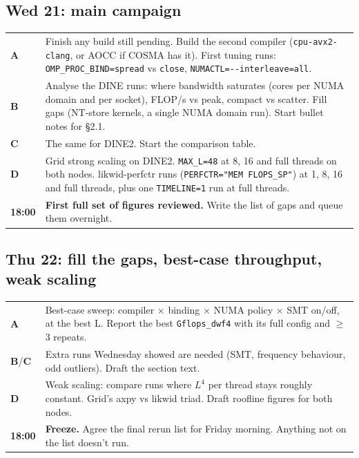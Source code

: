 \documentclass[10pt,a4paper]{article}
\newcommand{\who}[1]{\textbf{\color{accent}#1}}
\begin{document}
\subsection*{Wed 21: main campaign}
\begin{tabularx}{\linewidth}{@{}l L@{}}
\toprule
\who{A} & Finish any build still pending. Build the second compiler (\texttt{cpu-avx2-clang}, or AOCC if COSMA has it). First tuning runs: \texttt{OMP\_PROC\_BIND=spread} vs \texttt{close}, \texttt{NUMACTL=-{}-interleave=all}.\\
\who{B} & Analyse the DINE runs: where bandwidth saturates (cores per NUMA domain and per socket), FLOP/s vs peak, compact vs scatter. Fill gaps (NT-store kernels, a single NUMA domain run). Start bullet notes for \S2.1.\\
\who{C} & The same for DINE2. Start the comparison table.\\
\who{D} & Grid strong scaling on DINE2. \texttt{MAX\_L=48} at 8, 16 and full threads on both nodes. likwid-perfctr runs (\texttt{PERFCTR="MEM FLOPS\_SP"}) at 1, 8, 16 and full threads, plus one \texttt{TIMELINE=1} run at full threads.\\
\textbf{18:00} & \textbf{First full set of figures reviewed.} Write the list of gaps and queue them overnight.\\
\bottomrule
\end{tabularx}

\subsection*{Thu 22: fill the gaps, best-case throughput, weak scaling}
\begin{tabularx}{\linewidth}{@{}l L@{}}
\toprule
\who{A} & Best-case sweep: compiler $\times$ binding $\times$ NUMA policy $\times$ SMT on/off, at the best L. Report the best \texttt{Gflops\_dwf4} with its full config and $\geq$3 repeats.\\
\who{B}/\who{C} & Extra runs Wednesday showed are needed (SMT, frequency behaviour, odd outliers). Draft the section text.\\
\who{D} & Weak scaling: compare runs where $L^4$ per thread stays roughly constant. Grid's axpy vs likwid triad. Draft roofline figures for both nodes.\\
\textbf{18:00} & \textbf{Freeze.} Agree the final rerun list for Friday morning. Anything not on the list doesn't run.\\
\bottomrule
\end{tabularx}
\end{document}

